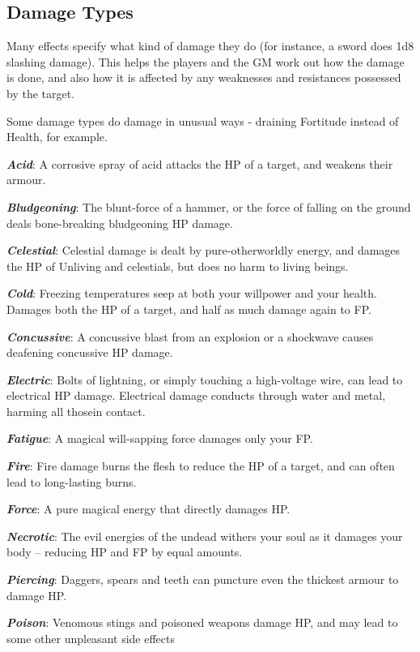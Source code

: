 \subsection{Damage Types}



Many effects specify what kind of damage they do (for instance, a sword does 1d8 slashing damage). This helps the players and the GM work out how the damage is done, and also how it is affected by any weaknesses and resistances possessed by the target. 

Some damage types do damage in unusual ways - draining Fortitude instead of Health, for example. 

\newcommand\damage[2]
{
\textbf{ \textit{#1}}: #2
}

\damage{Acid}{A corrosive spray of acid attacks the HP of a target, and weakens their armour.}

\damage{Bludgeoning}{The blunt-force of a hammer, or the force of falling on the ground deals bone-breaking bludgeoning HP damage.}

\damage{Celestial}{Celestial damage is dealt by pure-otherworldly energy, and damages the HP of Unliving and celestials, but does no harm to living beings.}

\damage{Cold}{Freezing temperatures seep at both your willpower and your health. Damages both the HP of a target, and half as much damage again to FP. } 

\damage{Concussive}{A concussive blast from an explosion or a shockwave causes deafening concussive HP damage.}

\damage{Electric}{Bolts of lightning, or simply touching a high-voltage wire, can lead to electrical HP damage. Electrical damage conducts through water and metal, harming all thosein contact.}

\damage{Fatigue}{A magical will-sapping force damages only your FP.}

\damage{Fire}{Fire damage burns the flesh to reduce the HP of a target, and can often lead to long-lasting burns.}

\damage{Force}{A pure magical energy that directly damages HP.}

\damage{Necrotic}{The evil energies of the undead withers your soul as it damages your body -- reducing HP and FP by equal amounts.}

\damage{Piercing}{Daggers, spears and teeth can puncture even the thickest armour to damage HP.}

\damage{Poison}{Venomous stings and poisoned weapons damage HP, and may lead to some other unpleasant side effects}


